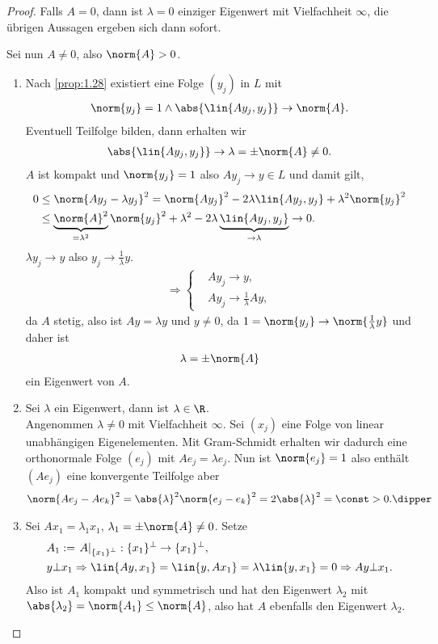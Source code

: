 \begin{proof}
Falls $A=0$, dann ist $\lambda = 0$ einziger Eigenwert mit Vielfachheit
$\infty$, die übrigen Aussagen ergeben sich dann sofort.

Sei nun $A\neq 0$, also $\norm{A} > 0$.
\begin{enumerate}[label=(\roman{*})]
  \item Nach \ref{prop:1.28} existiert eine Folge $(y_j)$ in $L$ mit
\begin{align*}
\norm{y_j} = 1 \land \abs{\lin{Ay_j,y_j}}\to\norm{A}.
\end{align*}
Eventuell Teilfolge bilden, dann erhalten wir
\begin{align*}
\abs{\lin{Ay_j,y_j}}\to\lambda = \pm \norm{A}\neq 0.
\end{align*}
$A$ ist kompakt und $\norm{y_j} = 1$ also $Ay_j \to y\in L$ und damit gilt,
\begin{align*}
0&\le \norm{Ay_j - \lambda y_j}^2 
= \norm{Ay_j}^2  -2\lambda \lin{A y_j,y_j} + \lambda^2\norm{y_j}^2
\\ &\le \underbrace{\norm{A}^2}_{=\lambda^2}\norm{y_j}^2 + \lambda^2 -
2\lambda\underbrace{\lin{Ay_j,y_j}}_{\to\lambda}
\to 0.
\end{align*}
$\lambda y_j \to y$ also $y_j\to\frac{1}{\lambda}y$.
\begin{align*}
\Rightarrow
\begin{cases}
&Ay_j\to y,\\
&Ay_j\to\frac{1}{\lambda}Ay,
\end{cases}
\end{align*}
da $A$ stetig, also ist $Ay = \lambda y$ und $y\neq 0$, da
$1=\norm{y_j}\to\norm{\frac{1}{\lambda}y}$ und daher ist
\begin{align*}
\lambda =\pm \norm{A}
\end{align*}
ein Eigenwert von $A$.
\item Sei $\lambda$ ein Eigenwert, dann ist $\lambda\in\R$.\\
Angenommen $\lambda\neq 0$ mit Vielfachheit $\infty$. Sei $(x_j)$ eine Folge
von linear unabhängigen Eigenelementen. Mit Gram-Schmidt erhalten wir dadurch
eine orthonormale Folge $(e_j)$ mit $Ae_j = \lambda e_j$. Nun ist
$\norm{e_j}=1$ also enthält $(Ae_j)$ eine konvergente Teilfolge aber
\begin{align*}
\norm{Ae_j - Ae_k}^2 = \abs{\lambda}^2\norm{e_j-e_k}^2 = 2\abs{\lambda}^2 =
\const > 0.\dipper
\end{align*}
\item Sei $Ax_1 = \lambda_1x_1$, $\lambda_1 = \pm\norm{A}\neq 0$. Setze
\begin{align*}
&A_1 := \left.A\right|_{\left\{x_1\right\}^\bot} : \{x_1\}^\bot \to
\{x_1\}^\bot,\\
&y\bot x_1 \Rightarrow \lin{Ay,x_1} = \lin{y,Ax_1} =
\lambda\lin{y,x_1} = 0\Rightarrow Ay\bot x_1.
\end{align*}
Also ist $A_1$ kompakt und symmetrisch und hat den Eigenwert $\lambda_2$ mit
$\abs{\lambda_2} = \norm{A_1}\le\norm{A}$, also hat $A$ ebenfalls den Eigenwert
$\lambda_2$.


\end{enumerate}
\end{proof}

